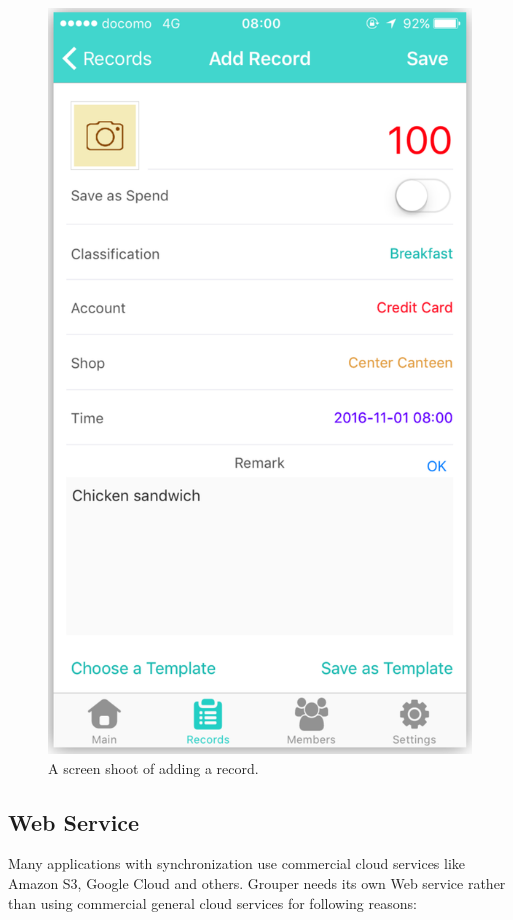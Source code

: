 \documentclass[twocolumn,10pt]{article}
\begin{document}
\begin{figure}[t]
	\centering
	\includegraphics[scale=0.18]{screenshoot}
	\caption{A screen shoot of adding a record.}
\end{figure}

\subsection{Web Service}
Many applications with synchronization use commercial cloud services like Amazon S3, Google Cloud and others. Grouper needs its own Web service rather than using commercial general cloud services for following reasons:
\end{document}
